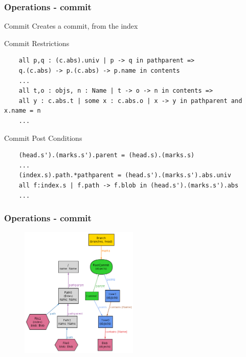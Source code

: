 \documentclass{beamer}
\begin{document}
\begin{frame}[fragile]
   \frametitle{Operations - commit}
   \begin{block}{Commit}
      Creates a commit, from the index
   \end{block}
   \tiny
   \begin{block}{Commit Restrictions}
   	\begin{lstlisting}
	all p,q : (c.abs).univ | p -> q in pathparent => 
	q.(c.abs) -> p.(c.abs) -> p.name in contents
	...
	all t,o : objs, n : Name | t -> o -> n in contents => 
	all y : c.abs.t | some x : c.abs.o | x -> y in pathparent and x.name = n
	...
   \end{lstlisting}
	\end{block}
	\begin{block}{Commit Post Conditions}
	\begin{lstlisting}
	(head.s').(marks.s').parent = (head.s).(marks.s)
	...
	(index.s).path.*pathparent = (head.s').(marks.s').abs.univ
	all f:index.s | f.path -> f.blob in (head.s').(marks.s').abs
	...
   	\end{lstlisting}
	\end{block}
\end{frame}

\begin{frame}[fragile]
   \frametitle{Operations - commit}
   \begin{figure}
      \centering
      \includegraphics[width=0.5\textwidth]{images/commit1.png}
   \end{figure}
\end{frame}
\end{document}
